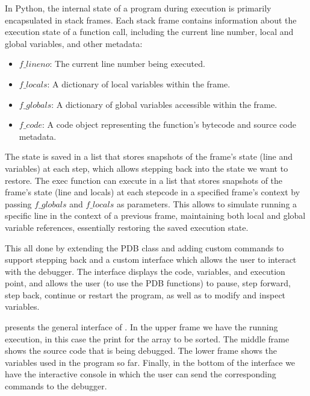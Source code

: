 In Python, the internal state of a program during execution is primarily encapsulated in 
stack frames. Each stack frame contains information about the execution state of a function 
call, including the current line number, local and global variables, and other metadata:
\begin{itemize}
    \item $f\_lineno$: The current line number being executed.
    \item $f\_locals$: A dictionary of local variables within the frame.
    \item $f\_globals$: A dictionary of global variables accessible within the frame.
    \item $f\_code$: A code object representing the function's bytecode and source code metadata.
\end{itemize}
The state is saved in a list that stores snapshots of the frame's state (line and variables) 
at each step, which allows stepping back into the state we want to restore. The exec function can execute 
in a list that stores snapshots of the frame's state (line and locals) at each stepcode in a 
specified frame's context by passing $f\_globals$ and $f\_locals$ as parameters. This allows 
\flik to simulate running a specific line in the context of a previous frame, maintaining 
both local and global variable references, essentially restoring the saved execution state.

This all done by extending the PDB class and adding custom commands to support stepping back
and a custom interface which allows the user to interact with the debugger. The interface 
displays the code, variables, and execution point, and allows the user (to use the \ac{PDB} 
functions) to pause, step forward, step back, continue or restart the program, as well as to 
modify and inspect variables. 

 presents the general interface of \flik. In 
the upper frame we have the running execution, in this case the print 
for the array to be sorted. The middle frame shows the source code that is being 
debugged. The lower frame shows the variables used in the 
program so far. Finally, in the bottom of the interface we have the interactive console in which the user can 
send the corresponding commands to the debugger.

